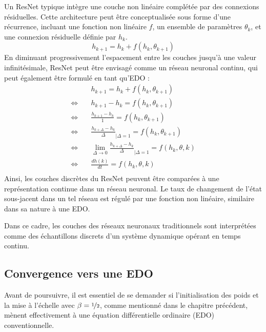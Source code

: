 Un ResNet typique intègre une couche non linéaire complétée par des connexions résiduelles. Cette architecture peut être conceptualisée sous forme d'une récurrence, incluant une fonction non linéaire $f$, un ensemble de paramètres $\theta_k$, et une connexion résiduelle définie par $h_k$.
\begin{equation}
    h_{k+1} = h_k + f(h_k, \theta_{k+1})
\end{equation}
En diminuant progressivement l'espacement entre les couches jusqu'à une valeur infinitésimale, ResNet peut être envisagé comme un réseau neuronal continu, qui peut également être formulé en tant qu'EDO :
\begin{align*}
    &h_{k+1} = h_k + f(h_k, \theta_{k+1}) \\
    \Leftrightarrow \quad &  h_{k+1} - h_k = f(h_k, \theta_{k+1}) \\
    \Leftrightarrow \quad & \frac{h_{k+1} - h_k}{1} = f(h_k, \theta_{k+1}) \\
    \Leftrightarrow \quad & \frac{h_{k+\Delta} - h_k}{\Delta}_{|\Delta=1} = f(h_k, \theta_{k+1}) \\
    \Leftrightarrow \quad & \lim_{\Delta \to 0} \frac{h_{k+\Delta} - h_k}{\Delta}_{|\Delta=1} = f(h_k, \theta, k) \\
    \Leftrightarrow \quad & \frac{dh(k)}{dt} = f(h_k, \theta, k) \\
\end{align*}
Ainsi, les couches discrètes du ResNet peuvent être comparées à une représentation continue dans un réseau neuronal. Le taux de changement de l'état sous-jacent dans un tel réseau est régulé par une fonction non linéaire, similaire dans sa nature à une EDO.

Dans ce cadre, les couches des réseaux neuronaux traditionnels sont interprétées comme des échantillons discrets d'un système dynamique opérant en temps continu.

\subsection{Convergence vers une EDO} %
Avant de poursuivre, il est essentiel de se demander si l'initialisation des poids et la mise à l'échelle avec $\beta = \nicefrac{1}{2}$, comme mentionné dans le chapitre précédent, mènent effectivement à une équation différentielle ordinaire (EDO) conventionnelle.

